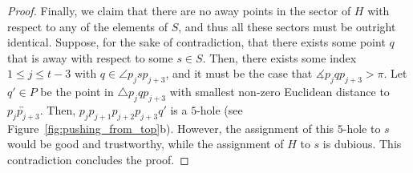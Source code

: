 \documentclass[10pt,a4paper]{amsart}
\begin{document}
\begin{proof}
Finally, we claim that there are no away points in the sector of $H$ with respect to any of the elements of $S$, and thus all these sectors must be outright identical. Suppose, for the sake of contradiction, that there exists some point $q$ that is away with respect to some $s\in S$. Then, there exists some index $1\leq j\leq t-3$ with $q\in\angle p_jsp_{j+3}$, and it must be the case that $\measuredangle p_jqp_{j+3}>\pi$. Let $q'\in P$ be the point in $\triangle p_jqp_{j+3}$ with smallest non-zero Euclidean distance to $\overleftrightarrow{p_jp_{j+3}}$. Then, $p_jp_{j+1}p_{j+2}p_{j+3}q'$ is a $5$-hole (see Figure~\ref{fig:pushing_from_top}b). However, the assignment of this $5$-hole to $s$ would be good and trustworthy, while the assignment of $H$ to $s$ is dubious. This contradiction concludes the proof.
\end{proof} 
\end{document}
